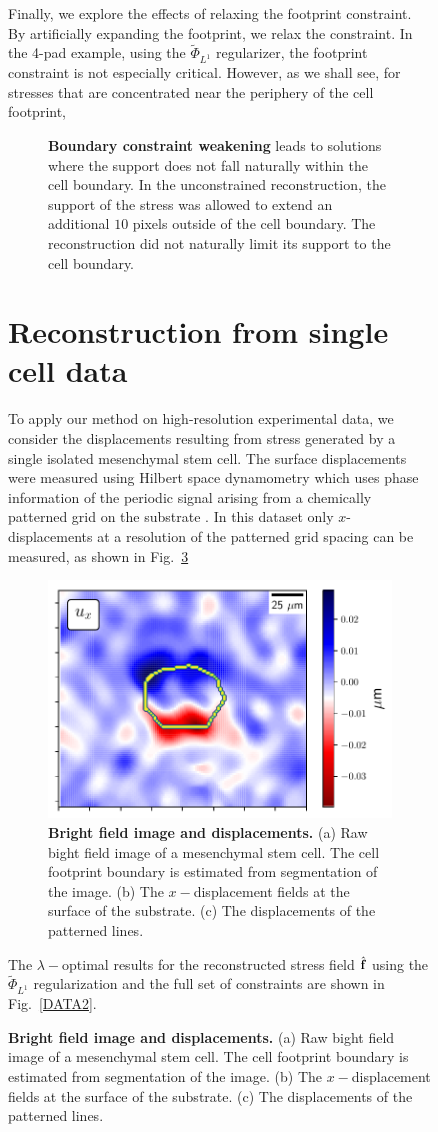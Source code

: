 \documentclass[aps,prl,reprint,twocolumn,groupedaddress,showpacs]{revtex4}
\def\f{{\bf f}}
\begin{document}
\begin{figure}
Finally, we explore the effects of relaxing the footprint constraint. 
By artificially expanding the footprint, we relax the 
constraint. In the 4-pad example, using the $\tilde{\Phi}_{L^{1}}$
regularizer, the footprint constraint is not 
especially critical. However, as we shall see, for stresses that are concentrated 
near the periphery of the cell footprint, 

\begin{figure}
\caption{\textbf{Boundary constraint weakening} leads to solutions
  where the support does not fall naturally within the cell
  boundary. In the unconstrained reconstruction, the support of the
  stress was allowed to extend an additional $10$ pixels outside of
  the cell boundary. The reconstruction did not naturally limit its
  support to the cell boundary.}
\label{fig:fig4}
\end{figure}


\section{Reconstruction from single cell data}

To apply our method on high-resolution experimental data, we consider
the displacements resulting from stress generated by a single isolated
mesenchymal stem cell. The surface displacements were measured using
Hilbert space dynamometry which uses phase information of the periodic
signal arising from a chemically patterned grid on the substrate
\cite{POPESCU}.  In this dataset only $x$-displacements at a
resolution of the patterned grid spacing can be measured, as shown in
Fig.~\ref{DATA}

\begin{figure}
\includegraphics[width=\linewidth]{fig0a}
\caption{\textbf{Bright field image and displacements.} (a) Raw bight
  field image of a mesenchymal stem cell. The cell footprint boundary
  is estimated from segmentation of the image. (b) The
  $x-$displacement fields at the surface of the substrate. (c) The
  displacements of the patterned lines.}
\label{DATA}
\end{figure}
%
The $\lambda-$optimal results for the reconstructed stress field
$\hat{\f}$ using the $\tilde{\Phi}_{L^{1}}$ regularization and the
full set of constraints are shown in Fig.~\ref{DATA2}.


\end{figure}
\end{document}
